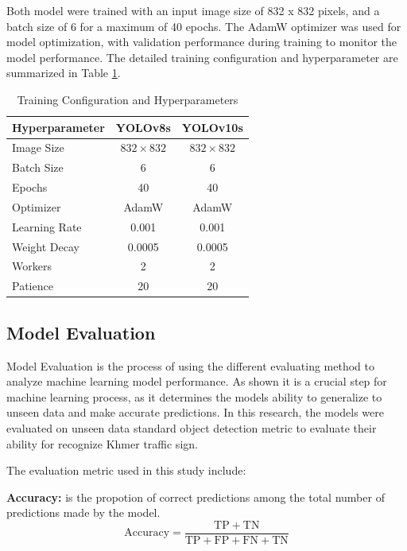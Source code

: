 Both model were trained with an input image size of 832 x 832 pixels, and a batch size of 6 for a maximum of 40 epochs. The AdamW optimizer was used for model optimization, with validation performance during training to monitor the model performance.
The detailed training configuration and hyperparameter are summarized in Table \ref{tab:training_hyperparameters}.
\begin{table}[ht]
    \centering
    \caption{Training Configuration and Hyperparameters}
    \label{tab:training_hyperparameters}
    \begin{tabular}{lcc}
        \hline\hline
        Hyperparameter & YOLOv8s & YOLOv10s \\ 
        \hline
        Image Size & $832 \times 832$ & $832 \times 832$ \\
        Batch Size & 6 & 6 \\
        Epochs & 40 & 40 \\
        Optimizer & AdamW & AdamW \\
        Learning Rate & 0.001 & 0.001 \\
        Weight Decay & 0.0005 & 0.0005 \\
        Workers & 2 & 2 \\
        Patience & 20 & 20 \\
        \hline\hline
    \end{tabular}
\end{table}
\subsection{Model Evaluation}
Model Evaluation is the process of using the different evaluating method to analyze machine learning model performance. As shown it is a crucial step for machine learning process, as it determines the models ability to generalize to unseen data and make accurate predictions.
In this research, the models were evaluated on unseen data standard object detection metric to evaluate their ability for recognize Khmer traffic sign.

The evaluation metric used in this study include:

\textbf{Accuracy:} is the propotion of correct predictions among the total number of predictions made by the model.
\begin{equation}
    \mathrm{Accuracy} = \frac{\mathrm{TP} + \mathrm{TN}}{\mathrm{TP} + \mathrm{FP} + \mathrm{FN} + \mathrm{TN}}
    \label{eq:accuracy}
\end{equation}

